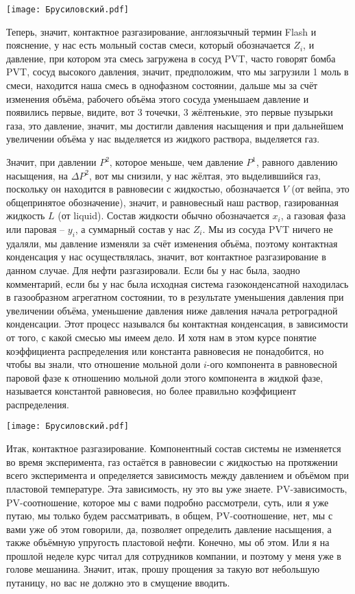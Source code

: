 \documentclass[main.tex]{subfiles}
\begin{document}
\begin{center}
\texttt{[image: Брусиловский.pdf]}
\end{center}

Теперь, значит, контактное разгазирование, англоязычный термин Flash и пояснение, у нас есть мольный состав смеси, который обозначается $Z_i$, и давление, при котором эта смесь загружена в сосуд PVT, часто говорят бомба PVT, сосуд высокого давления, значит, предположим, что мы загрузили 1 моль в смеси, находится наша смесь в однофазном состоянии, дальше мы за счёт изменения объёма, рабочего объёма этого сосуда уменьшаем давление и появились первые, видите, вот 3 точечки, 3 жёлтенькие, это первые пузырьки газа, это давление, значит, мы достигли давления насыщения и при дальнейшем увеличении объёма у нас выделяется из жидкого раствора, выделяется газ.

Значит, при давлении $P^2$, которое меньше, чем давление $P^1$, равного давлению насыщения, на $\Delta P^2$, вот мы снизили, у нас жёлтая, это выделившийся газ, поскольку он находится в равновесии с жидкостью, обозначается $V$ (от вейпа, это общепринятое обозначение), значит, и равновесный наш раствор, газированная жидкость $L$ (от liquid).
Состав жидкости обычно обозначается $x_i$, а газовая фаза или паровая -- $y_i$, а суммарный состав у нас $Z_i$.
Мы из сосуда PVT ничего не удаляли, мы давление изменяли за счёт изменения объёма, поэтому контактная конденсация у нас осуществлялась, значит, вот контактное разгазирование в данном случае.
Для нефти разгазировали.
Если бы у нас была, заодно комментарий, если бы у нас была исходная система газоконденсатной находилась в газообразном агрегатном состоянии, то в результате уменьшения давления при увеличении объёма, уменьшение давления ниже давления начала ретроградной конденсации.
Этот процесс назывался бы контактная конденсация, в зависимости от того, с какой смесью мы имеем дело.
И хотя нам в этом курсе понятие коэффициента распределения или константа равновесия не понадобится, но чтобы вы знали, что отношение мольной доли $i$-ого компонента в равновесной паровой фазе к отношению мольной доли этого компонента в жидкой фазе, называется константой равновесия, но более правильно коэффициент распределения.

\begin{center}
\texttt{[image: Брусиловский.pdf]}
\end{center}

Итак, контактное разгазирование.
Компонентный состав системы не изменяется во время эксперимента, газ остаётся в равновесии с жидкостью на протяжении всего эксперимента и определяется зависимость между давлением и объёмом при пластовой температуре.
Эта зависимость, ну это вы уже знаете.
PV-зависимость, PV-соотношение, которое мы с вами подробно рассмотрели, суть, или я уже путаю, мы только будем рассматривать, в общем, PV-соотношение, нет, мы с вами уже об этом говорили, да, позволяет определить давление насыщения, а также объёмную упругость пластовой нефти.
Конечно, мы об этом.
Или я на прошлой неделе курс читал для сотрудников компании, и поэтому у меня уже в голове мешанина.
Значит, итак, прошу прощения за такую вот небольшую путаницу, но вас не должно это в смущение вводить.
\end{document}

